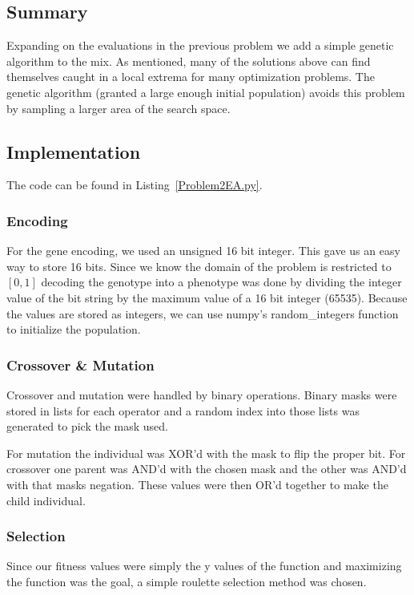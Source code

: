 \subsection{Summary}
Expanding on the evaluations in the previous problem we add a simple genetic algorithm to the mix. As mentioned, many of the solutions above can find themselves caught in a local extrema for many optimization problems. The genetic algorithm (granted a large enough initial population) avoids this problem by sampling a larger area of the search space.

\subsection{Implementation}
The code can be found in Listing~\ref{Problem2EA.py}.

\subsubsection{Encoding}
For the gene encoding, we used an unsigned 16 bit integer. This gave us an easy way to store 16 bits. Since we know the domain of the problem is restricted to $[0, 1]$ decoding the genotype into a phenotype was done by dividing the integer value of the bit string by the maximum value of a 16 bit integer (65535). Because the values are stored as integers, we can use numpy's random\_integers function to initialize the population.

\subsubsection{Crossover \& Mutation}
Crossover and mutation were handled by binary operations. Binary masks were stored in lists for each operator and a random index into those lists was generated to pick the mask used.

For mutation the individual was XOR'd with the mask to flip the proper bit. For crossover one parent was AND'd with the chosen mask and the other was AND'd with that masks negation. These values were then OR'd together to make the child individual.

\subsubsection{Selection}
Since our fitness values were simply the y values of the function and maximizing the function was the goal, a simple roulette selection method was chosen.

